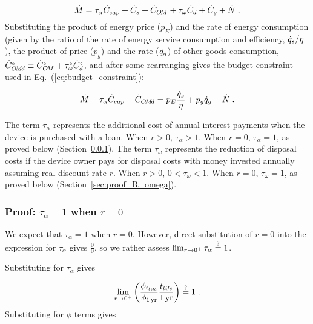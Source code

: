 \begin{equation}
  \dot{M} = \tau_\alpha \dot{C}_{cap} + 
             \dot{C}_s + 
             \dot{C}_{O\!M} + 
             \tau_\omega \dot{C}_d + 
             \dot{C}_g + 
             \dot{N} \; .
\end{equation}
%
Substituting the product of energy price ($p_E$) and
the rate of energy consumption
(given by the ratio of the rate of energy service consumption
and efficiency, $\dot{q}_s / \eta$),
the product of price ($p_g$) and
the rate ($\dot{q}_g$) of other goods consumption,
${}{\dot{C}}^{\scriptscriptstyle \circ}_{O\!M\!d} \equiv {}{\dot{C}}^{\scriptscriptstyle \circ}_{O\!M} + {}{\tau}^{\scriptscriptstyle \circ}_\omega {}{\dot{C}}^{\scriptscriptstyle \circ}_d$,
and after some rearranging gives the budget constraint
used in Eq.~(\ref{eq:budget_constraint}):

\begin{equation}
  \dot{M} - \tau_\alpha \dot{C}_{cap} - \dot{C}_{O\!M\!d} = p_E \frac{\dot{q}_s}{\eta} + p_g \dot{q}_g + \dot{N} \; .
\end{equation}

The term $\tau_\alpha$ represents the additional cost of annual interest
payments when the device is purchased with a loan.
When $r > 0$, $\tau_\alpha > 1$.
When $r = 0$, $\tau_\alpha = 1$, as proved below
(Section~\ref{sec:proof_R_alpha}).
The term $\tau_\omega$ represents the reduction of disposal costs 
if the device owner pays for disposal costs with money
invested annually assuming real discount rate $r$. 
When $r > 0$, $0 < \tau_\omega < 1$.
When $r = 0$, $\tau_\omega = 1$, as proved below
(Section~\ref{sec:proof_R_omega}).


\subsubsection{Proof: $\tau_\alpha = 1$ when $r = 0$}
\label{sec:proof_R_alpha}

We expect that $\tau_\alpha = 1$ when $r = 0$.
However, direct substitution of $r = 0$ into the expression
for $\tau_\alpha$ gives $\frac{0}{0}$, 
so we rather assess
$\lim_{r \to 0^+} \tau_\alpha \stackrel{?}{=} 1$.

Substituting for $\tau_\alpha$ gives

\begin{equation}
  \lim_{r \to 0^+} \left( \frac{\phi_{t_{li\!f\!e}}}{\phi_{1\,\mathrm{yr}}} \frac{t_{li\!f\!e}}{1\,\mathrm{yr}} \right) 
  \stackrel{?}{=} 1 \; .
\end{equation}
%
Substituting for $\phi$ terms gives

